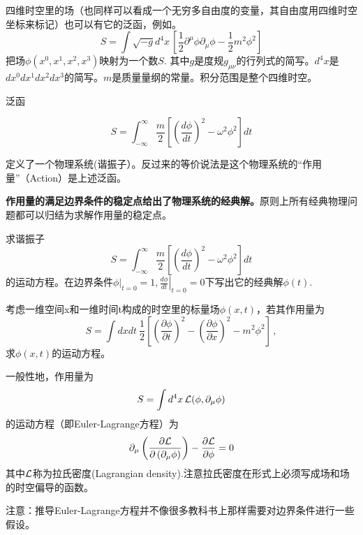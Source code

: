\documentclass[CJK]{beamer}
\begin{document}
\begin{frame}
\bch
四维时空里的场（也同样可以看成一个无穷多自由度的变量，其自由度用四维时空坐标来标记）也可以有它的泛函，例如。
\ech
\bex
$$ S = \int \sqrt{-g}d^4x\, \left[\frac{1}{2}\partial^\mu\phi \partial_\mu\phi - \frac{1}{2}m^2\phi^2\right]$$
\bch
把场$\phi(x^0,x^1, x^2, x^3)$映射为一个数$S$. 其中$g$是度规$g_{\mu\nu}$的行列式的简写。$d^4x$是$dx^0dx^1dx^2dx^3$的简写。$m$是质量量纲的常量。积分范围是整个四维时空。
\ech
\eex
\end{frame}

\begin{frame}
\bch
泛函

$$ S = \int_{-\infty}^\infty \frac{m}{2}\left[(\frac{d\phi}{dt})^2 - \omega^2\phi^2\right] dt$$

定义了一个物理系统(谐振子）。反过来的等价说法是这个物理系统的“作用量”（Action）是上述泛函。

\skipline
{\bf 作用量的满足边界条件的稳定点给出了物理系统的经典解。}原则上所有经典物理问题都可以归结为求解作用量的稳定点。
\ech

\end{frame}


\begin{frame}
\bch
求谐振子
$$ S = \int_{-\infty}^\infty \frac{m}{2}\left[(\frac{d\phi}{dt})^2 - \omega^2\phi^2\right] dt$$
的运动方程。在边界条件$\left.\phi\right\vert_{t=0} = 1, \left.\frac{d\phi}{dt}\right\vert_{t=0} = 0$下写出它的经典解$\phi(t)$.
\ech

\end{frame}


\begin{frame}
\bch
考虑一维空间x和一维时间t构成的时空里的标量场$\phi(x,t)$，若其作用量为
$$ S = \int dx dt \   \frac{1}{2} \left[\left(\frac{\partial \phi}{\partial t}\right)^2 - \left(\frac{\partial \phi}{\partial x}\right)^2 - m^2\phi^2\right]\, ,$$
求$\phi(x, t)$的运动方程。
\ech

\end{frame}


\begin{frame}
\bch
一般性地，作用量为
$$S = \int d^4x\,\mathcal{L}(\phi,\partial_\mu\phi)$$
的运动方程（即Euler-Lagrange方程）为
$$\partial_\mu\left(\frac{\partial \mathcal{L}}{\partial\left(\partial_\mu \phi\right)} \right)-\frac{\partial \mathcal{L}}{\partial \phi} = 0$$
其中$\mathcal{L}$称为拉氏密度(Lagrangian density).注意拉氏密度在形式上必须写成场和场的时空偏导的函数。

\skipline
注意：推导Euler-Lagrange方程并不像很多教科书上那样需要对边界条件进行一些假设。
\ech
\end{frame}
\end{document}

